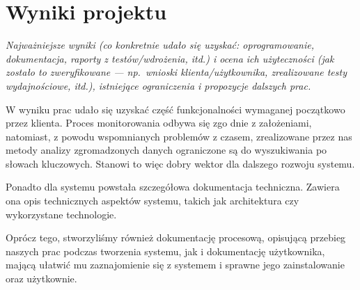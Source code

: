 \documentclass[polish,12pt]{aghthesis}
\begin{document}
\section{Wyniki projektu}

\label{sec:wyniki-projektu}

\emph{Najważniejsze wyniki (co konkretnie udało się uzyskać:
  oprogramowanie, dokumentacja, raporty z testów/wdrożenia, itd.)
  i ocena ich użyteczności (jak zostało to zweryfikowane --- np.\ wnioski
  klienta/użytkownika, zrealizowane testy wydajnościowe, itd.),
  istniejące ograniczenia i propozycje dalszych prac.}

W wyniku prac udało się uzyskać część funkcjonalności
wymaganej początkowo przez klienta. Proces monitorowania odbywa się zgo
dnie z założeniami, natomiast, z powodu wspomnianych problemów z czasem, zrealizowane przez nas metody analizy
zgromadzonych danych ograniczone są do wyszukiwania po słowach kluczowych. Stanowi
to więc dobry wektor dla dalszego rozwoju systemu.

Ponadto dla systemu powstała szczegółowa dokumentacja techniczna. Zawiera ona opis
technicznych aspektów systemu, takich jak architektura czy wykorzystane technologie.

Oprócz tego, stworzyliśmy również dokumentację procesową, opisującą przebieg naszych
prac podczas tworzenia systemu, jak i dokumentację użytkownika, mającą ułatwić mu 
zaznajomienie się z systemem i sprawne jego zainstalowanie oraz użytkownie. 


\nocite{artykul2011,ksiazka2011,narzedzie2011,projekt2011}


\end{document}
